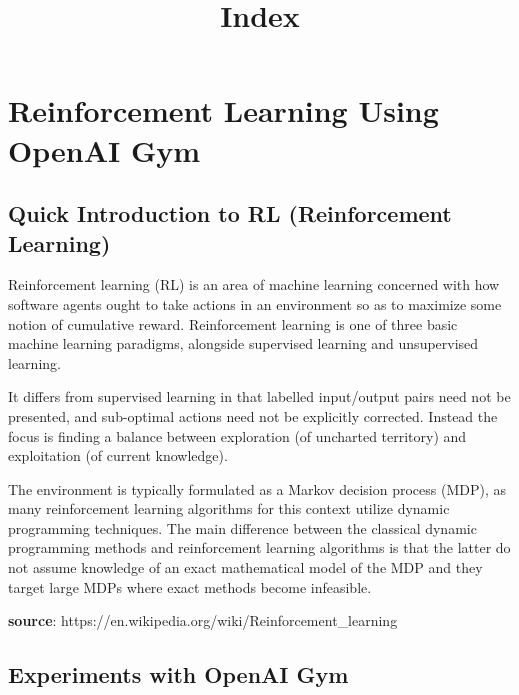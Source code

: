 \documentclass[11pt]{article}
\title{Index}
\begin{document}
    
    
    \maketitle
    
    

    
    \hypertarget{reinforcement-learning-using-openai-gym}{%
\section{Reinforcement Learning Using OpenAI
Gym}\label{reinforcement-learning-using-openai-gym}}

    \hypertarget{quick-introduction-to-rl-reinforcement-learning}{%
\subsection{Quick Introduction to RL (Reinforcement
Learning)}\label{quick-introduction-to-rl-reinforcement-learning}}

Reinforcement learning (RL) is an area of machine learning concerned
with how software agents ought to take actions in an environment so as
to maximize some notion of cumulative reward. Reinforcement learning is
one of three basic machine learning paradigms, alongside supervised
learning and unsupervised learning.

It differs from supervised learning in that labelled input/output pairs
need not be presented, and sub-optimal actions need not be explicitly
corrected. Instead the focus is finding a balance between exploration
(of uncharted territory) and exploitation (of current knowledge).

The environment is typically formulated as a Markov decision process
(MDP), as many reinforcement learning algorithms for this context
utilize dynamic programming techniques. The main difference between the
classical dynamic programming methods and reinforcement learning
algorithms is that the latter do not assume knowledge of an exact
mathematical model of the MDP and they target large MDPs where exact
methods become infeasible.

\textbf{source}: https://en.wikipedia.org/wiki/Reinforcement\_learning

    \hypertarget{experiments-with-openai-gym}{%
\subsection{Experiments with OpenAI
Gym}\label{experiments-with-openai-gym}}
\end{document}
